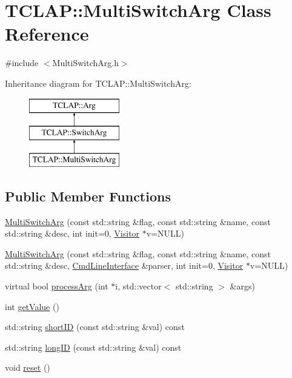 \hypertarget{class_t_c_l_a_p_1_1_multi_switch_arg}{}\section{T\+C\+L\+A\+P\+:\+:Multi\+Switch\+Arg Class Reference}
\label{class_t_c_l_a_p_1_1_multi_switch_arg}


{\ttfamily \#include $<$Multi\+Switch\+Arg.\+h$>$}

Inheritance diagram for T\+C\+L\+A\+P\+:\+:Multi\+Switch\+Arg\+:\begin{figure}[H]
\begin{center}
\leavevmode
\includegraphics[height=3.000000cm]{class_t_c_l_a_p_1_1_multi_switch_arg}
\end{center}
\end{figure}
\subsection*{Public Member Functions}
\begin{DoxyCompactItemize}
\item 
\hyperlink{class_t_c_l_a_p_1_1_multi_switch_arg_a37db9658517f206fd69936e1458d59b0}{Multi\+Switch\+Arg} (const std\+::string \&flag, const std\+::string \&name, const std\+::string \&desc, int init=0, \hyperlink{class_t_c_l_a_p_1_1_visitor}{Visitor} $\ast$v=N\+U\+L\+L)
\item 
\hyperlink{class_t_c_l_a_p_1_1_multi_switch_arg_a0443d4a222630ac45aa67e40f2de3541}{Multi\+Switch\+Arg} (const std\+::string \&flag, const std\+::string \&name, const std\+::string \&desc, \hyperlink{class_t_c_l_a_p_1_1_cmd_line_interface}{Cmd\+Line\+Interface} \&parser, int init=0, \hyperlink{class_t_c_l_a_p_1_1_visitor}{Visitor} $\ast$v=N\+U\+L\+L)
\item 
virtual bool \hyperlink{class_t_c_l_a_p_1_1_multi_switch_arg_a91c3d349570f21d8af6dc90767d747a2}{process\+Arg} (int $\ast$i, std\+::vector$<$ std\+::string $>$ \&args)
\item 
int \hyperlink{class_t_c_l_a_p_1_1_multi_switch_arg_a0389e414c11ebbab4a88dfbbf3af18bd}{get\+Value} ()
\item 
std\+::string \hyperlink{class_t_c_l_a_p_1_1_multi_switch_arg_a083c07003f948691e94ce94d0b6376ed}{short\+I\+D} (const std\+::string \&val) const 
\item 
std\+::string \hyperlink{class_t_c_l_a_p_1_1_multi_switch_arg_a0b0aacc09c93462bab4347f86db0fccd}{long\+I\+D} (const std\+::string \&val) const 
\item 
void \hyperlink{class_t_c_l_a_p_1_1_multi_switch_arg_ac320530811dbca7fdcb2a41ab252fce4}{reset} ()
\end{DoxyCompactItemize}
